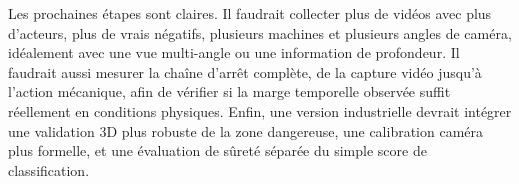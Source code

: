 \documentclass[11pt]{article}
\begin{document}
Les prochaines étapes sont claires. Il faudrait collecter plus de vidéos avec plus d'acteurs, plus de vrais négatifs, plusieurs machines et plusieurs angles de caméra, idéalement avec une vue multi-angle ou une information de profondeur. Il faudrait aussi mesurer la chaîne d'arrêt complète, de la capture vidéo jusqu'à l'action mécanique, afin de vérifier si la marge temporelle observée suffit réellement en conditions physiques. Enfin, une version industrielle devrait intégrer une validation 3D plus robuste de la zone dangereuse, une calibration caméra plus formelle, et une évaluation de sûreté séparée du simple score de classification.
\end{document}
